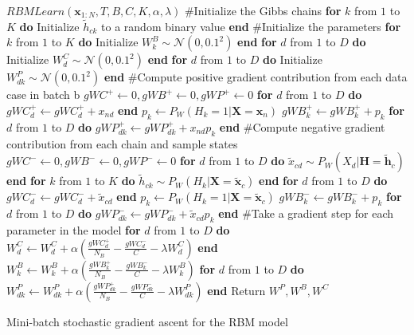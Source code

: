 \documentclass[11pt]{article}
\newcommand{\mbf}[1]{{\mathbf{#1}}}
\begin{document}
\begin{algorithm}
\begin{algorithmic}
\STATE $RBMLearn(\mbf{x}_{1:N},T,B,C,K,\alpha,\lambda)$
\STATE \#Initialize the Gibbs chains
\STATE \textbf{for} $k$ from $1$ to $K$ \textbf{do} Initialize $\tilde{h}_{ck}$ to a random binary value \textbf{end}
\ENDFOR
\STATE \#Initialize the parameters
\STATE \textbf{for} $k$ from $1$ to $K$ \textbf{do} Initialize $W^B_{k} \sim \mathcal{N}(0,0.1^2)$ \textbf{end}
\STATE \textbf{for} $d$ from $1$ to $D$ \textbf{do} Initialize $W^C_{d} \sim \mathcal{N}(0,0.1^2)$ \textbf{end}
\STATE \textbf{for} $d$ from $1$ to $D$ \textbf{do} Initialize $W^P_{dk} \sim \mathcal{N}(0,0.1^2)$ \textbf{end}
\ENDFOR
{}
    \STATE \#Compute positive gradient contribution from each data case in batch b
    \STATE $gWC^+ \leftarrow 0, gWB^+ \leftarrow 0, gWP^+\leftarrow 0$
      \STATE  \textbf{for} $d$ from $1$ to $D$ \textbf{do} $gWC_{d}^+ \leftarrow gWC_{d}^+ + x_{nd}$ \textbf{end}
        \STATE  $p_k \leftarrow P_W(H_k=1|\mbf{X}=\mbf{x}_n)$
        \STATE  $gWB_{k}^+ \leftarrow gWB_{k}^+ + p_k$
        \STATE  \textbf{for} $d$ from $1$ to $D$ \textbf{do} $gWP_{dk}^+ \leftarrow gWP_{dk}^+ + x_{nd}p_k$ \textbf{end}
      \ENDFOR
    \ENDFOR
    \STATE \#Compute negative gradient contribution from each chain and sample states
    \STATE $gWC^- \leftarrow 0, gWB^- \leftarrow 0, gWP^-\leftarrow 0$
      \STATE \textbf{for} $d$ from $1$ to $D$ \textbf{do} $\tilde{x}_{cd} \sim P_W(X_d|\mbf{H}=\tilde{\mbf{h}}_c)$ \textbf{end}
      \STATE \textbf{for} $k$ from $1$ to $K$ \textbf{do} $\tilde{h}_{ck} \sim P_W(H_k|\mbf{X}=\tilde{\mbf{x}}_c)$ \textbf{end}
      \STATE  \textbf{for} $d$ from $1$ to $D$ \textbf{do} $gWC_{d}^- \leftarrow gWC_{d}^- + \tilde{x}_{cd}$ \textbf{end}
        \STATE  $p_k \leftarrow P_W(H_k=1|\mbf{X}=\tilde{\mbf{x}}_c)$
        \STATE  $gWB_{k}^- \leftarrow gWB_{k}^- + p_k$
        \STATE  \textbf{for} $d$ from $1$ to $D$ \textbf{do}
            $gWP_{dk}^- \leftarrow gWP_{dk}^- + \tilde{x}_{cd}p_k$ \textbf{end}
      \ENDFOR
    \ENDFOR
      \STATE \#Take a gradient step for each parameter in the model
      \STATE   \textbf{for} $d$ from $1$ to $D$ \textbf{do}  $W^C_d \leftarrow W^C_d +  \alpha\left(\frac{gWC_{d}^+}{N_B} - 
               \frac{gWC_{d}^-}{C} -\lambda W^C_d\right)$ \textbf{end}
        \STATE  $W^B_k \leftarrow W^B_k +  \alpha\left(\frac{gWB_{k}^+}{N_B} - \frac{gWB_{k}^-}{C} -\lambda W^B_k\right)$
        \STATE   \textbf{for} $d$ from $1$ to $D$ \textbf{do}  $W^P_{dk} \leftarrow W^P_{dk} +  \alpha\left(\frac{gWP_{dk}^+}{N_B} - \frac{gWP_{dk}^-}{C} -\lambda W^P_{dk}\right)$ \textbf{end}
      \ENDFOR
  \ENDFOR
\ENDFOR
\STATE Return $W^P,W^B,W^C$
\end{algorithmic}
\caption{Mini-batch stochastic gradient ascent for the RBM model}
\label{learning}
\end{algorithm}
\end{document}
